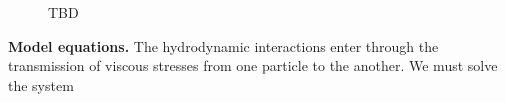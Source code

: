 \begin{figure}
    \caption{\label{fig:flow_map}TBD}
\end{figure}
\textbf{Model equations.}
The hydrodynamic interactions enter through the transmission of viscous stresses from one particle to the another.  
We must solve the system 
\setcounter{midequation}{\theequation}
\addtocounter{midequation}{2}

